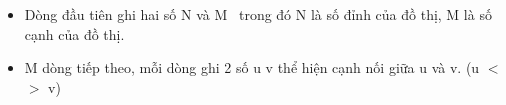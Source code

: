 \begin{itemize}
	\item     Dòng đầu tiên ghi hai số N và M  trong đó N là số đỉnh của đồ thị, M là số cạnh của đồ thị.   
	\item     M dòng tiếp theo, mỗi dòng ghi 2 số u v thể hiện cạnh nối giữa u và v. (u $<$$>$ v)   
\end{itemize}

\